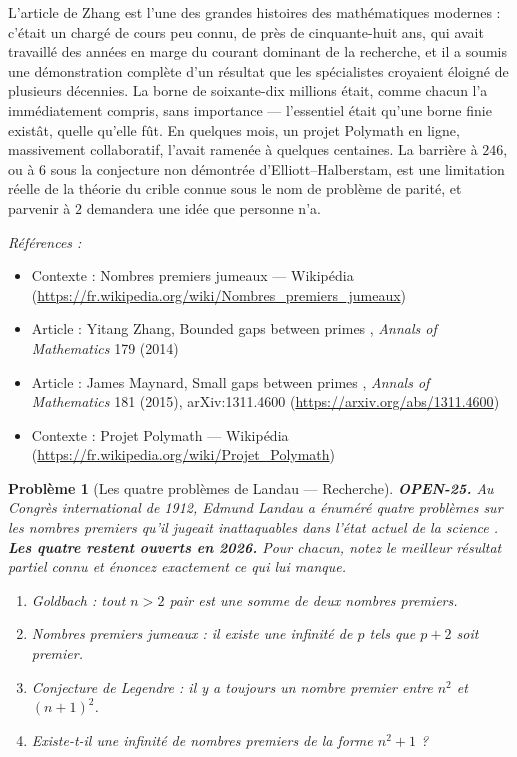 \documentclass[11pt]{article}
\newtheorem{problem}{Problème}
\newenvironment{refs}{\par\small\noindent\emph{Références :}\begin{itemize}\setlength\itemsep{0pt}}{\end{itemize}\normalsize}
\begin{document}
\noindent L'article de Zhang est l'une des grandes histoires des mathématiques
modernes : c'était un chargé de cours peu connu, de près de cinquante-huit ans, qui avait
travaillé des années en marge du courant dominant de la recherche, et il a soumis une
démonstration complète d'un résultat que les spécialistes croyaient éloigné de plusieurs
décennies. La borne de soixante-dix millions était, comme chacun l'a immédiatement
compris, sans importance --- l'essentiel était qu'une borne finie existât, quelle qu'elle
fût. En quelques mois, un projet Polymath en ligne, massivement collaboratif, l'avait
ramenée à quelques centaines. La barrière à $ 246 $, ou à $ 6 $ sous la conjecture non
démontrée d'Elliott--Halberstam, est une limitation réelle de la théorie du crible connue
sous le nom de problème de parité, et parvenir à $ 2 $ demandera une idée que personne
n'a.

\begin{refs}
\item Contexte : Nombres premiers jumeaux --- Wikipédia (\url{https://fr.wikipedia.org/wiki/Nombres_premiers_jumeaux})
\item Article : Yitang Zhang, \og{} Bounded gaps between primes \fg{}, \textit{Annals of Mathematics} 179 (2014)
\item Article : James Maynard, \og{} Small gaps between primes \fg{}, \textit{Annals of Mathematics} 181 (2015), arXiv:1311.4600 (\url{https://arxiv.org/abs/1311.4600})
\item Contexte : Projet Polymath --- Wikipédia (\url{https://fr.wikipedia.org/wiki/Projet_Polymath})
\end{refs}

\bigskip

\begin{problem}[{Les quatre problèmes de Landau --- Recherche}]
\textbf{OPEN-25.} Au Congrès international de 1912, Edmund Landau a énuméré quatre
problèmes sur les nombres premiers qu'il jugeait \og{} inattaquables dans l'état actuel de la
science \fg{}. \textbf{Les quatre restent ouverts en 2026.} Pour chacun, notez le meilleur
résultat partiel connu et énoncez exactement ce qui lui manque.
\begin{enumerate}
\item[(a)] Goldbach : tout $ n > 2 $ pair est une somme de deux nombres premiers.
\item[(b)] Nombres premiers jumeaux : il existe une infinité de $ p $ tels que $ p+2 $ soit
premier.
\item[(c)] Conjecture de Legendre : il y a toujours un nombre premier entre $ n^2 $ et
$ (n+1)^2 $.
\item[(d)] Existe-t-il une infinité de nombres premiers de la forme $ n^2 + 1 $ ?
\end{enumerate}

\end{problem}
\end{document}
